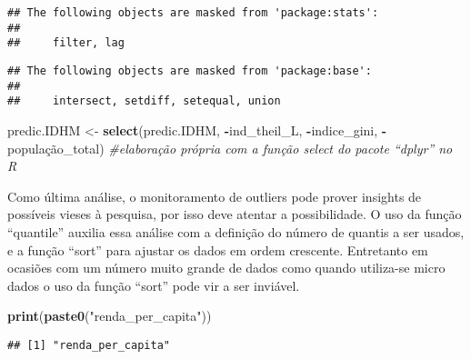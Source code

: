 \documentclass[
]{article}
\newenvironment{Shaded}{\begin{snugshade}}{\end{snugshade}}
\newcommand{\AttributeTok}[1]{\textcolor[rgb]{0.13,0.29,0.53}{#1}}
\newcommand{\CommentTok}[1]{\textcolor[rgb]{0.56,0.35,0.01}{\textit{#1}}}
\newcommand{\DecValTok}[1]{\textcolor[rgb]{0.00,0.00,0.81}{#1}}
\newcommand{\FunctionTok}[1]{\textcolor[rgb]{0.13,0.29,0.53}{\textbf{#1}}}
\newcommand{\NormalTok}[1]{#1}
\newcommand{\OtherTok}[1]{\textcolor[rgb]{0.56,0.35,0.01}{#1}}
\newcommand{\SpecialCharTok}[1]{\textcolor[rgb]{0.81,0.36,0.00}{\textbf{#1}}}
\newcommand{\StringTok}[1]{\textcolor[rgb]{0.31,0.60,0.02}{#1}}
\begin{document}
\begin{verbatim}
## The following objects are masked from 'package:stats':
## 
##     filter, lag
\end{verbatim}

\begin{verbatim}
## The following objects are masked from 'package:base':
## 
##     intersect, setdiff, setequal, union
\end{verbatim}

\begin{Shaded}
\begin{Highlighting}[]
\NormalTok{predic.IDHM }\OtherTok{\textless{}{-}} \FunctionTok{select}\NormalTok{(predic.IDHM, }\SpecialCharTok{{-}}\NormalTok{ind\_theil\_L, }\SpecialCharTok{{-}}\NormalTok{indice\_gini, }\SpecialCharTok{{-}}\NormalTok{população\_total)}
\CommentTok{\#elaboração própria com a função select do pacote “dplyr” no R}
\end{Highlighting}
\end{Shaded}

Como última análise, o monitoramento de outliers pode prover insights de
possíveis vieses à pesquisa, por isso deve atentar a possibilidade. O
uso da função ``quantile'' auxilia essa análise com a definição do
número de quantis a ser usados, e a função ``sort'' para ajustar os
dados em ordem crescente. Entretanto em ocasiões com um número muito
grande de dados como quando utiliza-se micro dados o uso da função
``sort'' pode vir a ser inviável.

\begin{Shaded}
\begin{Highlighting}[]
\FunctionTok{print}\NormalTok{(}\FunctionTok{paste0}\NormalTok{(}\StringTok{"renda\_per\_capita"}\NormalTok{))}
\end{Highlighting}
\end{Shaded}

\begin{verbatim}
## [1] "renda_per_capita"
\end{verbatim}

\begin{Shaded}
\end{Shaded}
\end{document}
